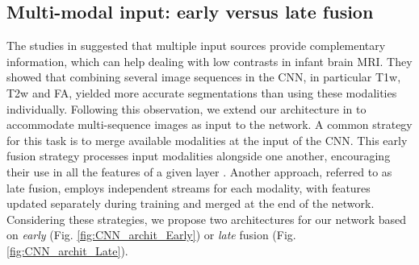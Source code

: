 \documentclass[twoside,espcrc2]{elsarticle}
\begin{document}
\subsection{Multi-modal input: early versus late fusion}
\label{ssec:multi-source}

The studies in \cite{zhang2015deep,nie2016fully} suggested that multiple input sources provide complementary information, which can help dealing with low contrasts in infant brain MRI. They showed that combining several image sequences in the CNN, in particular T1w, T2w and FA, yielded more accurate segmentations than using these modalities individually. Following this observation, we extend our architecture in \cite{DolzNeuro2017} to accommodate multi-sequence images as input to the network. A common strategy for this task is to merge available modalities at the input of the CNN. This early fusion strategy processes input modalities alongside one another, encouraging their use in all the features of a given layer  \cite{zhang2015deep}. Another approach, referred to as late fusion, employs independent streams for each modality, with features updated separately during training and merged at the end of the network. Considering these strategies, we propose two architectures for our network based on \textit{early} (Fig. \ref{fig:CNN_archit_Early}) or \textit{late} fusion (Fig. \ref{fig:CNN_archit_Late}). 






\end{document}
